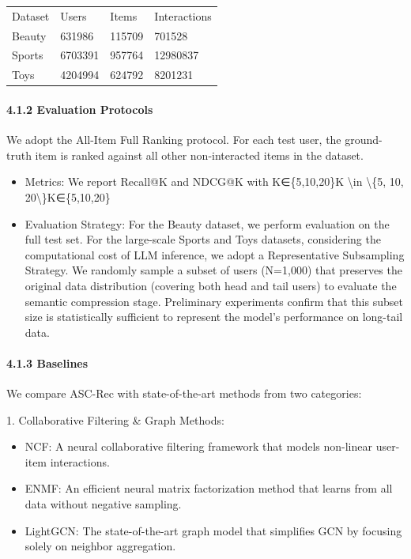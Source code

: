 \documentclass[]{article}
\let\oldparagraph\paragraph
\renewcommand{\paragraph}[1]{\oldparagraph{#1}\mbox{}}
\begin{document}
\begin{longtable}[]{@{}llll@{}}
\toprule
\endhead
Dataset & Users & Items & Interactions\tabularnewline
Beauty & 631986 & 115709 & 701528\tabularnewline
Sports & 6703391 & 957764 & 12980837\tabularnewline
Toys & 4204994 & 624792 & 8201231\tabularnewline
\bottomrule
\end{longtable}

\hypertarget{evaluation-protocols}{%
\paragraph{4.1.2 Evaluation Protocols}\label{evaluation-protocols}}

We adopt the All-Item Full Ranking protocol. For each test user, the
ground-truth item is ranked against all other non-interacted items in
the dataset.

\begin{itemize}
\item
  Metrics: We report Recall@K and NDCG@K with K∈\{5,10,20\}K
  \textbackslash{}in \textbackslash{}\{5, 10,
  20\textbackslash{}\}K∈\{5,10,20\}
\item
  Evaluation Strategy: For the Beauty dataset, we perform evaluation on
  the full test set. For the large-scale Sports and Toys datasets,
  considering the computational cost of LLM inference, we adopt a
  Representative Subsampling Strategy. We randomly sample a subset of
  users (N=1,000) that preserves the original data distribution
  (covering both head and tail users) to evaluate the semantic
  compression stage. Preliminary experiments confirm that this subset
  size is statistically sufficient to represent the model's performance
  on long-tail data.
\end{itemize}

\hypertarget{baselines}{%
\paragraph{4.1.3 Baselines}\label{baselines}}

We compare ASC-Rec with state-of-the-art methods from two categories:

1. Collaborative Filtering \& Graph Methods:

\begin{itemize}
\item
  NCF: A neural collaborative filtering framework that models non-linear
  user-item interactions.
\item
  ENMF: An efficient neural matrix factorization method that learns from
  all data without negative sampling.
\item
  LightGCN: The state-of-the-art graph model that simplifies GCN by
  focusing solely on neighbor aggregation.
\end{itemize}
\end{document}
